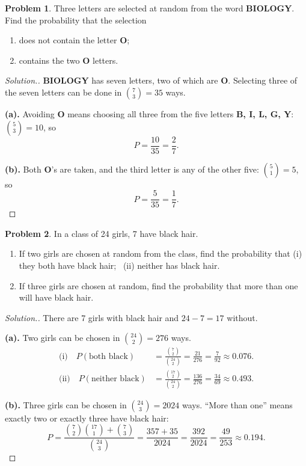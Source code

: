 \documentclass[12pt,a4paper]{report}
\theoremstyle{definition}
\theoremstyle{plain}
\theoremstyle{definition}
\newtheorem{problemx}{Problem}[section]
\newenvironment{problem}{\begin{problemx}}{\end{problemx}}
\newenvironment{solution}
  {\renewcommand{\qedsymbol}{}\begin{proof}[\textit{Solution}.]}
  {\end{proof}}
\begin{document}
\begin{problem}
Three letters are selected at random from the word \textbf{BIOLOGY}. Find the probability
that the selection
\begin{enumerate}
\item[(a).] does not contain the letter \textbf{O};
\item[(b).] contains the two \textbf{O} letters.
\end{enumerate}
\end{problem}

\begin{solution}
\textbf{BIOLOGY} has seven letters, two of which are \textbf{O}. Selecting three of the
seven letters can be done in $\binom{7}{3} = 35$ ways.

\textbf{(a).} Avoiding \textbf{O} means choosing all three from the five letters
\textbf{B, I, L, G, Y}: $\binom{5}{3} = 10$, so
\[P = \frac{10}{35} = \frac{2}{7}.\]

\textbf{(b).} Both \textbf{O}'s are taken, and the third letter is any of the other five:
$\binom{5}{1} = 5$, so
\[P = \frac{5}{35} = \frac{1}{7}.\]
\end{solution}

\begin{problem}
In a class of 24 girls, 7 have black hair.
\begin{enumerate}
\item[(a).] If two girls are chosen at random from the class, find the probability that
 (i) they both have black hair; \, (ii) neither has black hair.
\item[(b).] If three girls are chosen at random, find the probability that more than one
will have black hair.
\end{enumerate}
\end{problem}

\begin{solution}
There are 7 girls with black hair and $24-7 = 17$ without.

\textbf{(a).} Two girls can be chosen in $\binom{24}{2} = 276$ ways.
\begin{align*}
\text{(i)}\quad P(\text{both black}) &= \frac{\binom{7}{2}}{\binom{24}{2}}
 = \frac{21}{276} = \frac{7}{92} \approx 0.076.\\
\text{(ii)}\quad P(\text{neither black}) &= \frac{\binom{17}{2}}{\binom{24}{2}}
 = \frac{136}{276} = \frac{34}{69} \approx 0.493.
\end{align*}

\textbf{(b).} Three girls can be chosen in $\binom{24}{3} = 2024$ ways. ``More than one''
means exactly two or exactly three have black hair:
\[P = \frac{\binom{7}{2}\binom{17}{1}+\binom{7}{3}}{\binom{24}{3}}
 = \frac{357+35}{2024} = \frac{392}{2024} = \frac{49}{253} \approx 0.194.\]
\end{solution}
\end{document}
